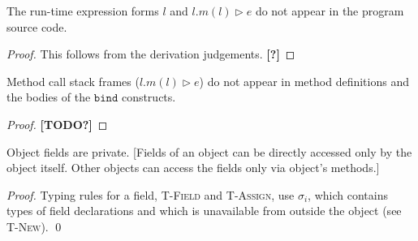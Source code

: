 \documentclass{llncs}
\newcommand{\keywadj}[1]{\mathtt{#1}}
\newcommand{\todo}[1]{\textbf{[#1]}}
\begin{document}

\begin{property}
The run-time expression forms $l$ and $l.m(l) \rhd e$ do not appear in the program source code.
\end{property}

\begin{proof} This follows from the derivation judgements. \todo{?}
\end{proof}

\begin{property}
\label{prop:mcsf-def-bind}
Method call stack frames ($l.m(l) \rhd e$) do not appear in method definitions and the bodies of the $\keywadj{bind}$ constructs.
\end{property}

\begin{proof}
\todo{TODO?}
\end{proof}

\begin{property}
\label{prop:fields-private}
Object fields are private. [Fields of an object can be directly accessed only by the object itself. Other objects can access the fields only via object's methods.]
\end{property}

\begin{proof}
Typing rules for a field, \textsc{T-Field} and \textsc{T-Assign}, use $\sigma_i$, which contains types of field declarations and which is unavailable from outside the object (see \textsc{T-New}). \qed
\end{proof}
\end{document}
